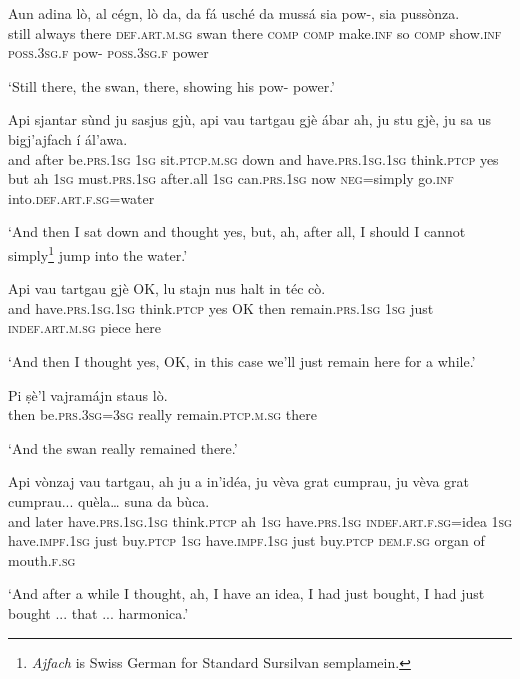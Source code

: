 \begin{linenumbers}
\gll  Aun adina lò, al cégn, lò da, da fá usché da mussá sia pow-, sia pussònza.  \\
still always there \textsc{def.art.m.sg} swan there \textsc{comp} \textsc{comp} make.\textsc{inf} so \textsc{comp} show.\textsc{inf} \textsc{poss.3sg.f} pow- \textsc{poss.3sg.f} power  \\
\end{linenumbers}
\medskip
\glt `Still there, the swan, there, showing his pow- power.'
\medskip

\begin{linenumbers}
\gll  Api sjantar sùnd ju sasjus gjù, api vau tartgau gjè ábar ah, ju stu gjè, ju sa us bigj’ajfach í ál’awa.  \\
and after be.\textsc{prs.1sg} \textsc{1sg} sit.\textsc{ptcp.m.sg} down and have.\textsc{prs.1sg.1sg} think.\textsc{ptcp} yes but ah \textsc{1sg} must.\textsc{prs.1sg} after.all \textsc{1sg} can.\textsc{prs.1sg} now \textsc{neg=}simply go.\textsc{inf} into.\textsc{def.art.f.sg=}water\\
\end{linenumbers}
\medskip
\glt `And then I sat down and thought yes, but, ah, after all, I should I cannot simply\footnote{\textit{Ajfach} is Swiss German for Standard Sursilvan semplamein.} jump into the water.'
\medskip

\begin{linenumbers}
\gll  Api vau tartgau gjè OK, lu stajn nus halt in téc cò.  \\
and have.\textsc{prs.1sg.1sg} think.\textsc{ptcp} yes OK then remain.\textsc{prs.1sg} \textsc{1sg}  just \textsc{indef.art.m.sg} piece here  \\
\end{linenumbers}
\medskip
\glt `And then I thought yes, OK, in this case we’ll just remain here for a while.'
\medskip

\begin{linenumbers}
\gll   Pi ṣè’l vajramájn staus lò. \\
then be.\textsc{prs.3sg=3sg} really remain.\textsc{ptcp.m.sg} there\\
\end{linenumbers}
\medskip
\glt `And the swan really remained there.'
\medskip

\begin{linenumbers}
\gll Api vònzaj vau tartgau, ah ju a in’idéa, ju vèva grat cumprau, ju vèva grat cumprau... quèla… suna da bùca.   \\
and later have.\textsc{prs.1sg.1sg} think.\textsc{ptcp} ah \textsc{1sg} have.\textsc{prs.1sg} \textsc{indef.art.f.sg=}idea \textsc{1sg} have.\textsc{impf.1sg} just buy.\textsc{ptcp} \textsc{1sg} have.\textsc{impf.1sg} just buy.\textsc{ptcp} \textsc{dem.f.sg} organ of mouth.\textsc{f.sg} \\
\end{linenumbers}
\medskip
\glt `And after a while I thought, ah, I have an idea, I had just bought, I had just bought ... that ... harmonica.'
\medskip

